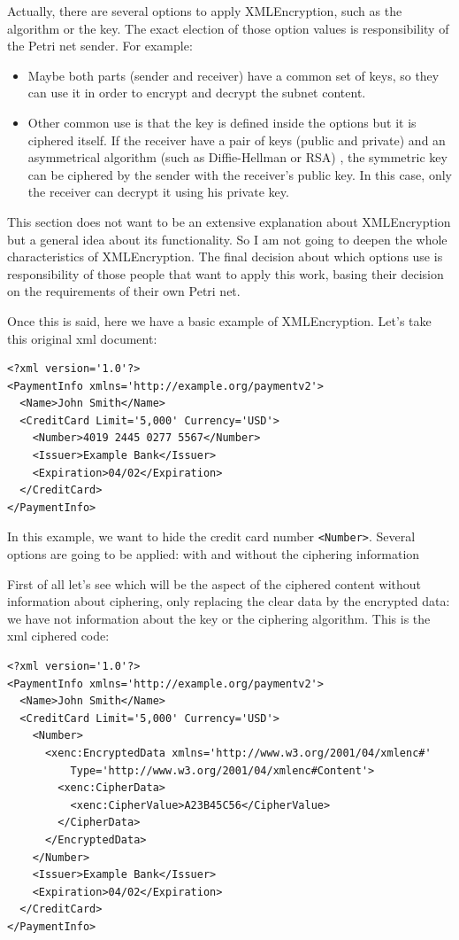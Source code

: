 Actually, there are several options to apply XMLEncryption, such as the algorithm
or the key. The exact election of those option values is responsibility of the Petri net sender. For example:
\begin{itemize}
 \item Maybe both parts (sender and receiver) have a common
set of keys, so they can use it in order to encrypt and decrypt the subnet
content.
 \item Other common use is that
the key is defined inside the options but it is ciphered itself. If the receiver
have a pair of keys (public and private) and an asymmetrical algorithm (such as Diffie-Hellman or RSA) , the symmetric key can be ciphered by
the sender with the receiver's public key. In this case, only the receiver
can decrypt it using his private key.
\end{itemize}

This section does not want to be an extensive explanation about XMLEncryption
but a general idea about its functionality. So I am not going to deepen the
whole characteristics of XMLEncryption. The final decision about which options
use is responsibility of those people that want to apply this work, basing their decision on the requirements of their own Petri net. 
 
Once this is said, here we have a basic example of XMLEncryption. Let's take this original xml document:

\begin{lstlisting}[label=xmlenc_example_1_1,caption=Clear xml content]
<?xml version='1.0'?>
<PaymentInfo xmlns='http://example.org/paymentv2'>
  <Name>John Smith</Name>
  <CreditCard Limit='5,000' Currency='USD'>
    <Number>4019 2445 0277 5567</Number>
    <Issuer>Example Bank</Issuer>
    <Expiration>04/02</Expiration>
  </CreditCard>
</PaymentInfo>
\end{lstlisting}

In this example, we want to hide the credit card number \texttt{\textless Number\textgreater}. Several options are going to be applied: with and without
the ciphering information


First of all let's see which will be the aspect of the ciphered content without
information about ciphering, only replacing the clear data by the encrypted
data:
we have not information about  the key or the ciphering algorithm. This
is the xml ciphered code:
\begin{lstlisting}[label=xmlenc_example_1_2,caption=Ciphered xml content
without ciphering information]
<?xml version='1.0'?>
<PaymentInfo xmlns='http://example.org/paymentv2'>
  <Name>John Smith</Name>
  <CreditCard Limit='5,000' Currency='USD'>
    <Number>
      <xenc:EncryptedData xmlns='http://www.w3.org/2001/04/xmlenc#'
          Type='http://www.w3.org/2001/04/xmlenc#Content'>
        <xenc:CipherData>
          <xenc:CipherValue>A23B45C56</CipherValue>
        </CipherData>
      </EncryptedData>
    </Number>
    <Issuer>Example Bank</Issuer>
    <Expiration>04/02</Expiration>
  </CreditCard>
</PaymentInfo>
\end{lstlisting}

